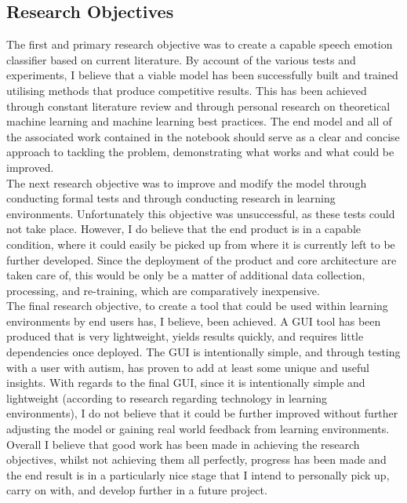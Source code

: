 \documentclass[12pt]{article}
\begin{document}
\subsection{Research Objectives}
The first and primary research objective was to create a capable speech emotion classifier based on current literature. By account of the various tests and experiments, I believe that a viable model has been successfully built and trained utilising methods that produce competitive results. This has been achieved through constant literature review and through personal research on theoretical machine learning and machine learning best practices. The end model and all of the associated work contained in the notebook should serve as a clear and concise approach to tackling the problem, demonstrating what works and what could be improved. 
\\

\noindent The next research objective was to improve and modify the model through conducting formal tests and through conducting research in learning environments. Unfortunately this objective was unsuccessful, as these tests could not take place. However, I do believe that the end product is in a capable condition, where it could easily be picked up from where it is currently left to be further developed. Since the deployment of the product and core architecture are taken care of, this would be only be a matter of additional data collection, processing, and re-training, which are comparatively inexpensive. 
\\

\noindent The final research objective, to create a tool that could be used within learning environments by end users has, I believe, been achieved. A GUI tool has been produced that is very lightweight, yields results quickly, and requires little dependencies once deployed. The GUI is intentionally simple, and through testing with a user with autism, has proven to add at least some unique and useful insights. With regards to the final GUI, since it is intentionally simple and lightweight (according to research regarding technology in learning environments), I do not believe that it could be further improved without further adjusting the model or gaining real world feedback from learning environments.
\\

\noindent Overall I believe that good work has been made in achieving the research objectives, whilst not achieving them all perfectly, progress has been made and the end result is in a particularly nice stage that I intend to personally pick up, carry on with, and develop further in a future project. 
\end{document}
